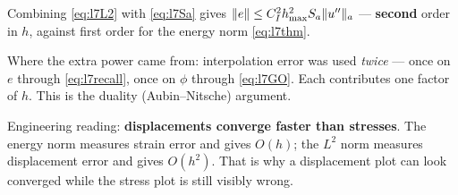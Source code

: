 
\begin{intuition}
Combining \eqref{eq:l7L2} with \eqref{eq:l7Sa} gives
$\lVert e\rVert\le C_{I}^{2}h_{\max}^{2}S_{a}\lVert u''\rVert_{a}$ --- \textbf{second}
order in $h$, against first order for the energy norm \eqref{eq:l7thm}.

Where the extra power came from: interpolation error was used \emph{twice} ---
once on $e$ through \eqref{eq:l7recall}, once on $\phi$ through
\eqref{eq:l7GO}. Each contributes one factor of $h$. This is the duality
(Aubin--Nitsche) argument.

Engineering reading: \textbf{displacements converge faster than stresses}. The
energy norm measures strain error and gives $O(h)$; the $L^2$ norm measures
displacement error and gives $O(h^2)$. That is why a displacement plot can look
converged while the stress plot is still visibly wrong.
\end{intuition}

